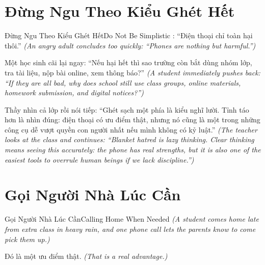\section{Đừng Ngu Theo Kiểu Ghét Hết}
\begin{truyen}{Đừng Ngu Theo Kiểu Ghét Hết}{Do Not Be Simplistic}
: ``Điện thoại chỉ toàn hại thôi.''
\textit{(An angry adult concludes too quickly: ``Phones are nothing but harmful.'')}

Một học sinh cãi lại ngay: ``Nếu hại hết thì sao trường còn bắt dùng nhóm lớp, tra tài liệu, nộp bài online, xem thông báo?''
\textit{(A student immediately pushes back: ``If they are all bad, why does school still use class groups, online materials, homework submission, and digital notices?'')}


Thầy nhìn cả lớp rồi nói tiếp: ``Ghét sạch một phía là kiểu nghĩ lười. Tỉnh táo hơn là nhìn đúng: điện thoại có ưu điểm thật, nhưng nó cũng là một trong những công cụ dễ vượt quyền con người nhất nếu mình không có kỷ luật.''
\textit{(The teacher looks at the class and continues: ``Blanket hatred is lazy thinking. Clear thinking means seeing this accurately: the phone has real strengths, but it is also one of the easiest tools to overrule human beings if we lack discipline.'')}
\end{truyen}

\section{Gọi Người Nhà Lúc Cần}
\begin{truyen}{Gọi Người Nhà Lúc Cần}{Calling Home When Needed}
\textit{(A student comes home late from extra class in heavy rain, and one phone call lets the parents know to come pick them up.)}

Đó là một ưu điểm thật.
\textit{(That is a real advantage.)}

\end{truyen}

